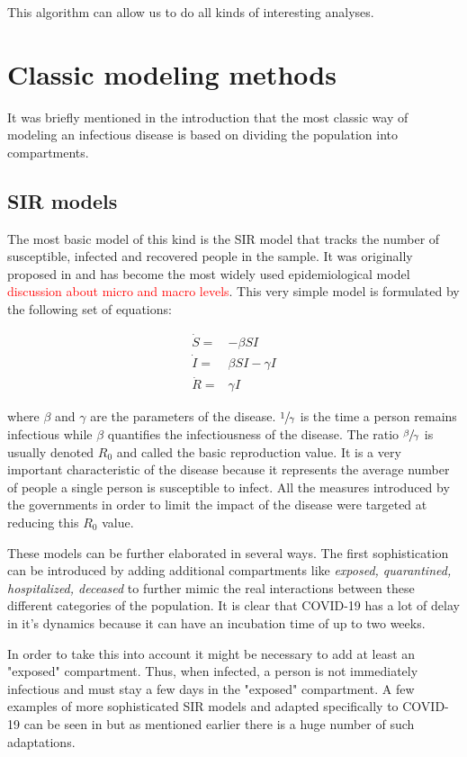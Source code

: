 \documentclass[12pt, letterpaper]{article}
\newcommand{\com}[1]{{\small {\fontfamily{ptm} \selectfont \textcolor{red}{#1}}}}
\begin{document}
This algorithm can allow us to do all kinds of interesting analyses. 

\section{Classic modeling methods}\label{sec:class}

It was briefly mentioned in the introduction that the most classic way of modeling an infectious disease is based on dividing the population into compartments. 

\subsection{SIR models}

The most basic model of this kind is the SIR model that tracks the number of susceptible, infected and recovered people in the sample. 
It was originally proposed in \cite{sir} and has become the most widely used epidemiological model \com{discussion about micro and macro levels}. 
This very simple model is formulated by the following set of equations:

\begin{align*}
\dot{S} = &- \beta SI \\
\dot{I} = &\beta SI - \gamma I \\
\dot{R} = & \gamma I
\end{align*}

where $\beta$ and $\gamma$ are the parameters of the disease. 
$\sfrac{1}{\gamma}$ is the time a person remains infectious while $\beta$ quantifies the infectiousness of the disease. 
The ratio $\sfrac{\beta}{\gamma}$ is usually denoted $R_0$ and called the basic reproduction value. 
It is a very important characteristic of the disease because it represents the average number of people a single person is susceptible to infect. 
All the measures introduced by the governments in order to limit the impact of the disease were targeted at reducing this $R_0$ value. 

These models can be further elaborated in several ways. 
The first sophistication can be introduced by adding additional compartments like {\em exposed, quarantined, hospitalized, deceased} to further mimic the real interactions between these different categories of the population. 
It is clear that COVID-19 has a lot of delay in it's dynamics \cite{delay} because it can have an incubation time of up to two weeks. 

In order to take this into account it might be necessary to add at least an "exposed" compartment. 
Thus, when infected, a person is not immediately infectious and must stay a few days in the "exposed" compartment. 
A few examples of more sophisticated SIR models and adapted specifically to COVID-19 can be seen in \cite{seir} but as mentioned earlier there is a huge number of such adaptations.
\end{document}
